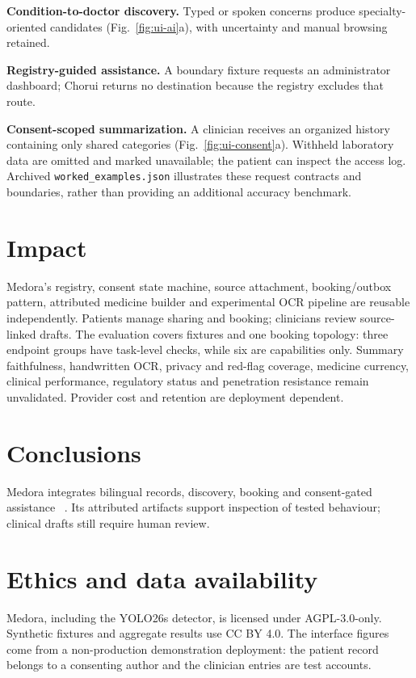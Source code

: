 \documentclass[preprint,12pt,a4paper]{elsarticle}
\begin{document}
\textbf{Condition-to-doctor discovery.} Typed or spoken concerns produce specialty-oriented
candidates (Fig.~\ref{fig:ui-ai}a), with uncertainty and manual browsing retained.

\textbf{Registry-guided assistance.} A boundary fixture requests an administrator
dashboard; Chorui returns no destination because the registry excludes that route.

\textbf{Consent-scoped summarization.} A clinician receives an organized history containing
only shared categories (Fig.~\ref{fig:ui-consent}a). Withheld laboratory data are omitted
and marked unavailable; the patient can inspect the access log. Archived
\texttt{worked\_examples.json} illustrates these request contracts and boundaries,
rather than providing an additional accuracy benchmark.

\section{Impact}

Medora's registry, consent state machine, source attachment, booking/outbox pattern,
attributed medicine builder and experimental OCR pipeline are reusable independently.
Patients manage sharing and booking; clinicians review source-linked drafts. The
evaluation covers fixtures and one booking topology: three endpoint groups have
task-level checks, while six are capabilities only. Summary faithfulness, handwritten
OCR, privacy and red-flag coverage, medicine currency, clinical performance, regulatory
status and penetration resistance remain unvalidated. Provider cost and retention are
deployment dependent.

\section{Conclusions}

Medora integrates bilingual records, discovery, booking and consent-gated assistance
~\cite{medorasw}. Its attributed artifacts support inspection of tested behaviour;
clinical drafts still require human review.

\section*{Ethics and data availability}
\label{sec:ethics}

Medora, including the YOLO26s detector, is licensed under AGPL-3.0-only. Synthetic
fixtures and aggregate results use CC BY 4.0. The interface figures come from a non-production demonstration
deployment: the patient record belongs to a consenting author and the clinician entries are
test accounts.
\end{document}
